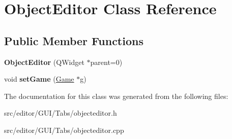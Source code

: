 \hypertarget{class_object_editor}{\section{\-Object\-Editor \-Class \-Reference}
\label{class_object_editor}
}
\subsection*{\-Public \-Member \-Functions}
\begin{DoxyCompactItemize}
\item 
\hypertarget{class_object_editor_a7a84cedc42e8c15e3c461e7b6db2f196}{{\bfseries \-Object\-Editor} (\-Q\-Widget $\ast$parent=0)}\label{class_object_editor_a7a84cedc42e8c15e3c461e7b6db2f196}

\item 
\hypertarget{class_object_editor_ae6402ec2acc0b45b142bf61eff453b7e}{void {\bfseries set\-Game} (\hyperlink{class_game}{\-Game} $\ast$g)}\label{class_object_editor_ae6402ec2acc0b45b142bf61eff453b7e}

\end{DoxyCompactItemize}


\-The documentation for this class was generated from the following files\-:\begin{DoxyCompactItemize}
\item 
src/editor/\-G\-U\-I/\-Tabs/objecteditor.\-h\item 
src/editor/\-G\-U\-I/\-Tabs/objecteditor.\-cpp\end{DoxyCompactItemize}

